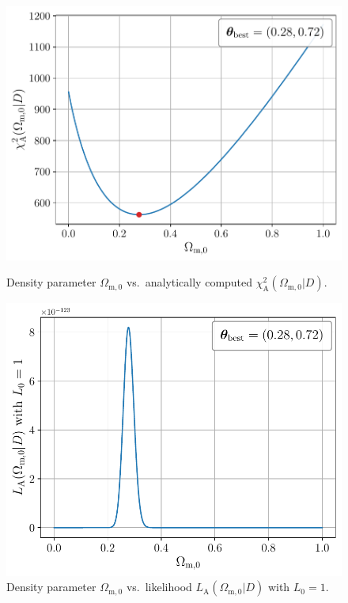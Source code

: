 \begin{figure}[ht]
    \begin{minipage}{8cm}
        \centering
        \includegraphics[scale=0.52]{figures/plots/PDF/MWE-analytic-chi2.pdf}
        \caption{Density parameter $\Omega_{\text{m},0}$ vs.\ analytically computed $\chi_{\text{A}}^2(\Omega_{\text{m},0} \vert D)$.}
        \label{fig:MWE-analytic-chi2}
    \end{minipage}
    \hspace*{1cm}
    \begin{minipage}{8cm}
        \centering
        \includegraphics[scale=0.52]{figures/plots/PDF/MWE-analytic-likelihood_L0_1.pdf}
        \caption{Density parameter $\Omega_{\text{m},0}$ vs.\ likelihood $L_{\text{A}}(\Omega_{\text{m},0} \vert D)$ with $L_{0} = 1$.}
        \label{fig:MWE-analytic-likelihood-L0-1}
    \end{minipage}
\end{figure}


